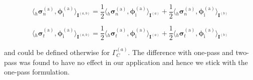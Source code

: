  \begin{equation}
 {\langle {}_h\bm{\sigma}^{\mathrm{(a)}}_n,  \bm \phi^{\mathrm{(a)}}_{\mathrm{i}} \rangle_{ \bm I^{(a,b)}}}=
\frac{1}{2} {\langle {}_h\bm{\sigma}^{\mathrm{(a)}}_n,  \bm \phi^{\mathrm{(a)}}_{\mathrm{i}} \rangle_{ \bm I^{(a)}}}+
\frac{1}{2} {\langle {}_h\bm{\sigma}^{\mathrm{(a)}}_n,  \bm \phi^{\mathrm{(a)}}_{\mathrm{i}} \rangle_{ \bm I^{(b)}}}
 \end{equation}
 
  \begin{equation}
 {\langle {}_h\bm{\sigma}^{\mathrm{(a)}}_t,  \bm \phi^{\mathrm{(a)}}_{\mathrm{i}} \rangle_{ \bm I^{(a,b)}}}=
\frac{1}{2} {\langle {}_h\bm{\sigma}^{\mathrm{(a)}}_t,  \bm \phi^{\mathrm{(a)}}_{\mathrm{i}} \rangle_{ \bm I^{(a)}}}+
\frac{1}{2} {\langle {}_h\bm{\sigma}^{\mathrm{(a)}}_t,  \bm \phi^{\mathrm{(a)}}_{\mathrm{i}} \rangle_{ \bm I^{(b)}}}
 \end{equation}
 
 and could be defined otherwise for $\Gamma_C^{(a)}$. The difference with one-pass and two-pass was found to have no effect in our application and hence we stick with the one-pass formulation.\\
 
 \iffalse
 The equation could be further simplified where the projection of a basis $\bm \phi^{\mathrm{(k)}}$ in it's own space  $H^{-1/2}(\Gamma^{(\mathrm{k})}_C)$ can be defined through Kronecker delta product as
 
 \begin{equation}
\langle \bm \phi_{i}^{(\mathrm{k})}, \bm \phi_{j}^{(\mathrm{k})} \rangle = \delta_{(i,j)}^{(\mathrm{k})} = \left\{ {\begin{array}{cl}
   1 & {i=j}  \\
   0 & {i \neq j}
\end{array}} \right.
\end{equation}
\fi 
 


